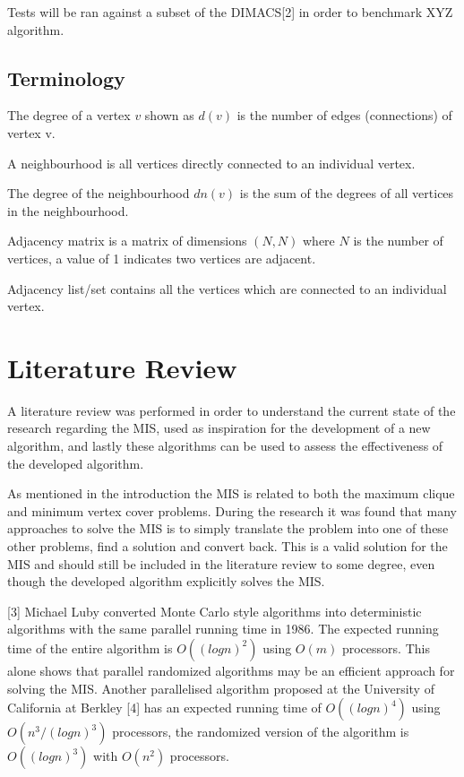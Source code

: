 \documentclass[conference]{IEEEtran}
\begin{document}
Tests will be ran against a subset of the DIMACS[2] in order to benchmark XYZ algorithm.

\subsection{Terminology}

The degree of a vertex $v$ shown as $d(v)$ is the number of edges (connections) of vertex v.

A neighbourhood is all vertices directly connected to an individual vertex.

The degree of the neighbourhood $dn(v)$ is the sum of the degrees of all vertices in the neighbourhood.

Adjacency matrix is a matrix of dimensions $(N, N)$ where $N$ is the number of vertices, a value of 1 indicates two
vertices are adjacent.

Adjacency list/set contains all the vertices which are connected to an individual vertex.

\section{Literature Review}
A literature review was performed in order to understand the current state of the research regarding the MIS, 
used as inspiration for the development of a new algorithm, and lastly these algorithms can be used to assess the 
effectiveness of the developed algorithm.

As mentioned in the introduction the MIS is related to both the maximum clique and minimum vertex cover problems. During
the research it was found that many approaches to solve the MIS is to simply translate the problem into one of these 
other problems, find a solution and convert back. This is a valid solution for the MIS and should still be included in 
the literature review to some degree, even though the developed algorithm explicitly solves the MIS.  

[3] Michael Luby converted Monte Carlo style algorithms into deterministic algorithms with the same parallel running
time in 1986. The expected running time of the entire algorithm is $O((logn)^2)$ using $O(m)$ processors. This alone 
shows that parallel randomized algorithms may be an efficient approach for solving the MIS. Another parallelised 
algorithm proposed at the University of California at Berkley [4] has an expected running time of $O((logn)^4)$ using
$O(n^3 / (logn) ^ 3)$ processors, the randomized version of the algorithm is $O((logn)^3)$ with $O(n^2)$ processors.
\end{document}
